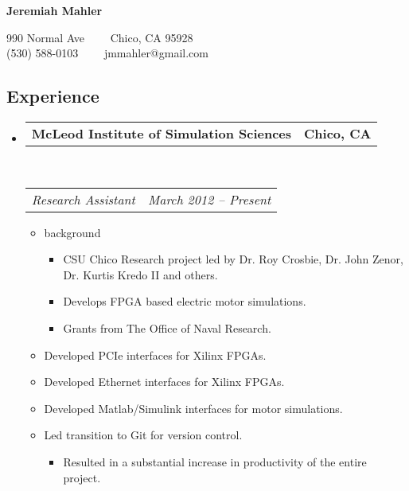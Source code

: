 \documentclass[11pt,letterpaper]{article}
\makeatletter
\newcommand{\headerrow}[2]
{\begin{tabular*}{\linewidth}{l@{\extracolsep{\fill}}r}
	#1 &
	#2 \\
\end{tabular*}}
\makeatother
\begin{document}
\vspace*{0.5em}

\begin{center}
{\LARGE \textbf{Jeremiah Mahler}}

\vspace{0.2em}

990 Normal Ave\ \ \textbullet
\ \ Chico, CA 95928
\\
(530) 588-0103\ \ \textbullet
\ \ jmmahler@gmail.com
\end{center}

\vspace{0.5em}

\subsection*{Experience}

\begin{itemize}
	\parskip=0.1em

	\item
	\headerrow
		{\textbf{McLeod Institute of Simulation Sciences}}
		{\textbf{Chico, CA}}
	\\
	\headerrow
		{\emph{Research Assistant}}
		{\emph{March 2012 -- Present}}
	
	\begin{itemize}
		\item background
		\begin{itemize}
			\item CSU Chico Research project led by Dr. Roy Crosbie,
			Dr. John Zenor, Dr. Kurtis Kredo II and others.
			\item Develops FPGA based electric motor simulations.
			\item Grants from The Office of Naval Research.
		\end{itemize}

		\item Developed PCIe interfaces for Xilinx FPGAs.
		\item Developed Ethernet interfaces for Xilinx FPGAs.
		\item Developed Matlab/Simulink interfaces for motor simulations.
		\item Led transition to Git for version control.
			\begin{itemize}
			\item Resulted in a substantial increase in productivity of
					the entire project.
			\end{itemize}
	\end{itemize}
\end{itemize}
\end{document}
